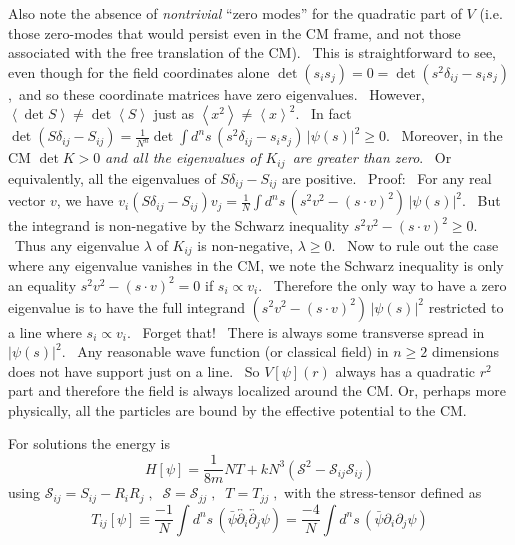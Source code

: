 \documentclass[a4paper,12pt]{article}%
\begin{document}
Also note the absence of \emph{nontrivial} ``zero modes'' for the quadratic
part of $V$ (i.e. those zero-modes that would persist even in the CM frame,
and not those associated with the free translation of the CM). \ This is
straightforward to see, even though for the field coordinates alone
$\det\left(  s_{i}s_{j}\right)  =0=\det\left(  s^{2}\delta_{ij}-s_{i}%
s_{j}\right)  $,\ and so these coordinate matrices have zero eigenvalues.
\ However, $\left\langle \det S\right\rangle \neq\det\left\langle
S\right\rangle $ just as $\left\langle x^{2}\right\rangle \neq\left\langle
x\right\rangle ^{2}$. \ In fact $\det\left(  S\delta_{ij}-S_{ij}\right)
=\frac{1}{N^{n}}\det\int d^{n}s\,\left(  s^{2}\delta_{ij}-s_{i}s_{j}\right)
\,\left|  \psi\left(  s\right)  \right|  ^{2}\geq0$. \ Moreover, in the CM
$\det K>0$ \emph{and all the eigenvalues of }$K_{ij}$\emph{\ are greater than
zero}. \ Or equivalently, all the eigenvalues of $S\delta_{ij}-S_{ij}$ are
positive. \ Proof: \ For any real vector $v$, we have $v_{i}\left(
S\delta_{ij}-S_{ij}\right)  v_{j}=\frac{1}{N}\int d^{n}s\,\left(  s^{2}%
v^{2}-\left(  s\cdot v\right)  ^{2}\right)  \,\left|  \psi\left(  s\right)
\right|  ^{2}$. \ But the integrand is non-negative by the Schwarz inequality
$s^{2}v^{2}-\left(  s\cdot v\right)  ^{2}\geq0$. \ Thus any eigenvalue
$\lambda$ of $K_{ij}$ is non-negative, $\lambda\geq0$. \ Now to rule out the
case where any eigenvalue vanishes in the CM, we note the Schwarz inequality
is only an equality $s^{2}v^{2}-\left(  s\cdot v\right)  ^{2}=0$ if
$s_{i}\propto v_{i}$. \ Therefore the only way to have a zero eigenvalue is to
have the full integrand $\left(  s^{2}v^{2}-\left(  s\cdot v\right)
^{2}\right)  \,\left|  \psi\left(  s\right)  \right|  ^{2}$ restricted to a
line where $s_{i}\propto v_{i}$. \ Forget that! \ There is always some
transverse spread in $\left|  \psi\left(  s\right)  \right|  ^{2}$. \ Any
reasonable wave function (or classical field) in $n\geq2$ dimensions does not
have support just on a line. \ So $V\left[  \psi\right]  \left(  r\right)  $
always has a quadratic $r^{2}$ part and therefore the field is always
localized around the CM. Or, perhaps more physically, all the particles are
bound by the effective potential to the CM.

For solutions the energy is
\[
H[\psi]=\frac{1}{8m}NT+kN^{3}\left(  \mathcal{S}^{2}-\mathcal{S}%
_{ij}\mathcal{S}_{ij}\right)
\]
using $\mathcal{S}_{ij}=S_{ij}-R_{i}R_{j}\;,\;\;\mathcal{S}=\mathcal{S}%
_{jj}\;,\;\;T=T_{jj}\;,$ with the stress-tensor defined as%
\[
T_{ij}\left[  \psi\right]  \equiv\frac{-1}{N}\int d^{n}s\,\left(  \bar{\psi
}\overleftrightarrow{\partial_{i}}\overleftrightarrow{\partial_{j}}%
\psi\right)  =\frac{-4}{N}\int d^{n}s\,\left(  \bar{\psi}\partial_{i}%
\partial_{j}\psi\right)
\]
\end{document}
